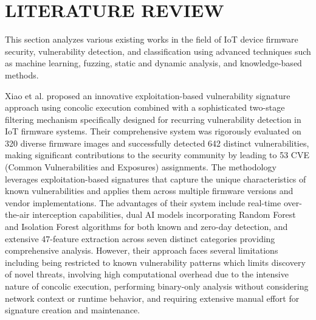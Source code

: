 \chapter{LITERATURE REVIEW}

This section analyzes various existing works in the field of IoT device firmware security, vulnerability detection, and classification using advanced techniques such as machine learning, fuzzing, static and dynamic analysis, and knowledge-based methods.

Xiao et al. \cite{xiao2024ccs} proposed an innovative exploitation-based vulnerability signature approach using concolic execution combined with a sophisticated two-stage filtering mechanism specifically designed for recurring vulnerability detection in IoT firmware systems. Their comprehensive system was rigorously evaluated on 320 diverse firmware images and successfully detected 642 distinct vulnerabilities, making significant contributions to the security community by leading to 53 CVE (Common Vulnerabilities and Exposures) assignments. The methodology leverages exploitation-based signatures that capture the unique characteristics of known vulnerabilities and applies them across multiple firmware versions and vendor implementations. The advantages of their system include real-time over-the-air interception capabilities, dual AI models incorporating Random Forest and Isolation Forest algorithms for both known and zero-day detection, and extensive 47-feature extraction across seven distinct categories providing comprehensive analysis. However, their approach faces several limitations including being restricted to known vulnerability patterns which limits discovery of novel threats, involving high computational overhead due to the intensive nature of concolic execution, performing binary-only analysis without considering network context or runtime behavior, and requiring extensive manual effort for signature creation and maintenance. 

